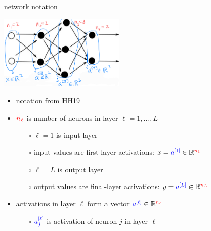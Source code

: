 \documentclass[xcolor={svgnames},
               hyperref={colorlinks,citecolor=DeepPink4,linkcolor=FireBrick,urlcolor=Maroon}]
               {beamer}
\newcommand{\RR}{\mathbb{R}}
\begin{document}
\begin{frame}{network notation}

\begin{center}
\includegraphics[height=35mm]{figs/state-notation}
\end{center}

\begin{itemize}
\item notation from HH19
\item ${\color{red} n_\ell}$ is number of neurons in layer $\ell=1,\dots,L$
    \begin{itemize}
    \item[$\circ$] $\ell=1$ is input layer
    \item[$\circ$] input values are first-layer activations: $x = {\color{blue} a^{[1]}} \in \RR^{{\color{red} n_1}}$
    \item[$\circ$] $\ell=L$ is output layer
    \item[$\circ$] output values are final-layer activations: $y = {\color{blue} a^{[L]}} \in \RR^{{\color{red} n_L}}$
    \end{itemize}
\item activations in layer $\ell$ form a vector ${\color{blue} a^{[\ell]}} \in \RR^{{\color{red} n_\ell}}$
    \begin{itemize}
    \item[$\circ$] ${\color{blue} a_j^{[\ell]}}$ is activation of neuron $j$ in layer $\ell$
    \end{itemize}
\end{itemize}
\end{frame}
\end{document}
